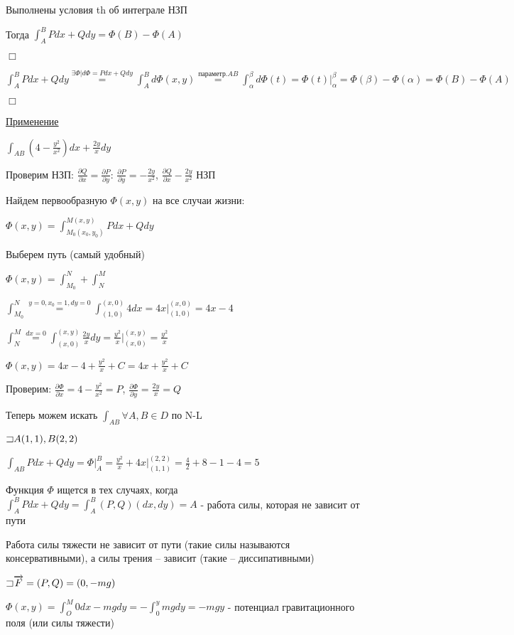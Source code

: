 \documentclass[12pt]{article}
\begin{document}
    Выполнены условия th об интеграле НЗП

    Тогда $\int_A^B Pdx + Qdy = \Phi(B) - \Phi(A)$

    $\Box$

    $\int_A^B Pdx + Qdy \stackrel{\exists \Phi | d\Phi = Pdx + Qdy}{=} \int_A^B d\Phi(x, y) \stackrel{\text{параметр.} AB}{=}
    \int_\alpha^\beta d\Phi(t) = \Phi(t) \Big|_\alpha^\beta = \Phi(\beta) - \Phi(\alpha) = \Phi(B) - \Phi(A)$

    $\Box$

    \underline{Применение}

    \Ex $\int_{AB} \left(4 - \frac{y^2}{x^2}\right)dx + \frac{2y}{x}dy$

    Проверим НЗП: $\frac{\partial Q}{\partial x} = \frac{\partial P}{\partial y}$: $\frac{\partial P}{\partial y} = -\frac{2y}{x^2}$, $\frac{\partial Q}{\partial x} -\frac{2y}{x^2}$ \Longleftrightarrow НЗП

    Найдем первообразную $\Phi(x, y)$ на все случаи жизни:

    $\Phi(x, y) = \int_{M_0(x_0, y_0)}^{M(x, y)} Pdx + Qdy$

    Выберем путь (самый удобный)

    $\Phi(x, y) = \int_{M_0}^{N} + \int_{N}^{M}$

    $\int_{M_0}^{N} \stackrel{y = 0, x_0 = 1, dy = 0}{=} \int_{(1, 0)}^{(x, 0)} 4 dx = 4x \Big|_{(1,0)}^{(x,0)} = 4x - 4$

    $\int_{N}^{M} \stackrel{dx = 0}{=} \int_{(x, 0)}^{(x, y)} \frac{2y}{x} dy = \frac{y^2}{x} \Big|_{(x,0)}^{(x,y)} = \frac{y^2}{x}$

    $\Phi(x, y) = 4x - 4 + \frac{y^2}{x} + C = 4x + \frac{y^2}{x} + C$

    Проверим: $\frac{\partial \Phi}{\partial x} = 4 - \frac{y^2}{x^2} = P$, $\frac{\partial \Phi}{\partial y} = \frac{2y}{x} = Q$

    Теперь можем искать $\int_{AB} \forall A, B \in D$ по N-L

    $\mathord{\sqsupset} A(1, 1), B(2, 2)$

    $\int_{AB} Pdx + Qdy = \Phi \Big|_A^B = \frac{y^2}{x} + 4x \Big|_{(1,1)}^{(2,2)} = \frac{4}{2} + 8 - 1 - 4 = 5$

    \Nota Функция $\Phi$ ищется в тех случаях, когда $\int_A^B Pdx + Qdy = \int^B_A (P, Q) (dx, dy) = A$ - работа силы, которая не зависит от пути

    \Exs Работа силы тяжести не зависит от пути (такие силы называются консервативными), а силы трения -- зависит (такие -- диссипативными)

    \Ex $\mathord{\sqsupset} \overrightarrow{F} = (P, Q) = (0, -mg)$

    $\Phi(x, y) = \int_O^M 0dx - mgdy = -\int_0^y mgdy = -mgy$ - потенциал гравитационного поля (или силы тяжести)
\end{document}
